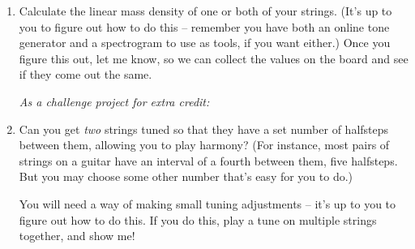 \documentclass[12pt]{article}
\begin{document}
\begin{enumerate}
\item Calculate the linear mass density of one or both of your strings. (It's up to you to figure out how to do this -- remember you have both 
an online tone generator and a spectrogram to use as tools, if you want either.) Once you figure this out, let me know, so we can collect the values
on the board and see if they come out the same. 

\vspace{2in}
\newpage
{\it As a challenge project for extra credit:}

\item Can you get {\it two} strings tuned so that they have a set number of halfsteps between them, allowing you to play harmony? (For instance,
most pairs of strings on a guitar have an interval of a fourth between them, five halfsteps. But you may choose some other number that's easy for you
to do.)

You will need a way of making small tuning adjustments -- it's up to you to figure out how to do this. If you do this, play a tune on multiple strings
together, and show me!
 
\end{enumerate}
\end{document}
